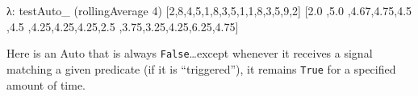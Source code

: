 \documentclass[]{article}
\newenvironment{Shaded}{}{}
\newcommand{\KeywordTok}[1]{\textcolor[rgb]{0.00,0.44,0.13}{\textbf{{#1}}}}
\newcommand{\DataTypeTok}[1]{\textcolor[rgb]{0.56,0.13,0.00}{{#1}}}
\newcommand{\DecValTok}[1]{\textcolor[rgb]{0.25,0.63,0.44}{{#1}}}
\newcommand{\FloatTok}[1]{\textcolor[rgb]{0.25,0.63,0.44}{{#1}}}
\newcommand{\CommentTok}[1]{\textcolor[rgb]{0.38,0.63,0.69}{\textit{{#1}}}}
\newcommand{\OtherTok}[1]{\textcolor[rgb]{0.00,0.44,0.13}{{#1}}}
\newcommand{\FunctionTok}[1]{\textcolor[rgb]{0.02,0.16,0.49}{{#1}}}
\newcommand{\NormalTok}[1]{{#1}}
\begin{document}
\begin{Shaded}
\end{Shaded}

\begin{Shaded}
\begin{Highlighting}[]
\NormalTok{λ}\FunctionTok{:} \NormalTok{testAuto_ (rollingAverage }\DecValTok{4}\NormalTok{) [}\DecValTok{2}\NormalTok{,}\DecValTok{8}\NormalTok{,}\DecValTok{4}\NormalTok{,}\DecValTok{5}\NormalTok{,}\DecValTok{1}\NormalTok{,}\DecValTok{8}\NormalTok{,}\DecValTok{3}\NormalTok{,}\DecValTok{5}\NormalTok{,}\DecValTok{1}\NormalTok{,}\DecValTok{1}\NormalTok{,}\DecValTok{8}\NormalTok{,}\DecValTok{3}\NormalTok{,}\DecValTok{5}\NormalTok{,}\DecValTok{9}\NormalTok{,}\DecValTok{2}\NormalTok{]}
\NormalTok{[}\FloatTok{2.0} \NormalTok{,}\FloatTok{5.0} \NormalTok{,}\FloatTok{4.67}\NormalTok{,}\FloatTok{4.75}\NormalTok{,}\FloatTok{4.5}
\NormalTok{,}\FloatTok{4.5} \NormalTok{,}\FloatTok{4.25}\NormalTok{,}\FloatTok{4.25}\NormalTok{,}\FloatTok{4.25}\NormalTok{,}\FloatTok{2.5}
\NormalTok{,}\FloatTok{3.75}\NormalTok{,}\FloatTok{3.25}\NormalTok{,}\FloatTok{4.25}\NormalTok{,}\FloatTok{6.25}\NormalTok{,}\FloatTok{4.75}\NormalTok{]}
\end{Highlighting}
\end{Shaded}

Here is an Auto that is always \texttt{False}\ldots{}except whenever it
receives a signal matching a given predicate (if it is ``triggered''),
it remains \texttt{True} for a specified amount of time.
\end{document}
